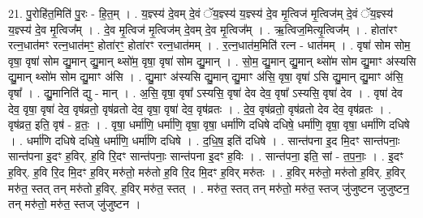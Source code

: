 \documentclass[17pt]{extarticle}
\begin{document}
21. पु॒रोहि॑त॒मिति॑ पु॒रः - हि॒त॒म् । . य॒ज्ञ्स्य॑ दे॒वम् दे॒वं ॅय॒ज्ञ्स्य॑ य॒ज्ञ्स्य॑ दे॒व मृ॒त्विज॑ मृ॒त्विज॑म् दे॒वं ॅय॒ज्ञ्स्य॑ य॒ज्ञ्स्य॑ दे॒व मृ॒त्विज᳚म् । . दे॒व मृ॒त्विज॑ मृ॒त्विज॑म् दे॒वम् दे॒व मृ॒त्विज᳚म् । . ऋ॒त्विज॒मित्यृ॒त्विज᳚म् । . होता॑रꣳ रत्न॒धात॑मꣳ रत्न॒धात॑मꣳ॒॒ होता॑रꣳ॒॒ होता॑रꣳ रत्न॒धात॑मम् । . र॒त्न॒धात॑म॒मिति॑ रत्न - धात॑मम् । . वृषा॑ सोम सोम॒ वृषा॒ वृषा॑ सोम द्यु॒मान् द्यु॒मान् थ्सो॑म॒ वृषा॒ वृषा॑ सोम द्यु॒मान् । . सो॒म॒ द्यु॒मान् द्यु॒मान् थ्सो॑म सोम द्यु॒माꣳ अ॑स्यसि द्यु॒मान् थ्सो॑म सोम द्यु॒माꣳ अ॑सि । . द्यु॒माꣳ अ॑स्यसि द्यु॒मान् द्यु॒माꣳ अ॑सि॒ वृषा॒ वृषा॑ ऽसि द्यु॒मान् द्यु॒माꣳ अ॑सि॒ वृषा᳚ । . द्यु॒मानिति॑ द्यु - मान् । . अ॒सि॒ वृषा॒ वृषा᳚ ऽस्यसि॒ वृषा॑ देव देव॒ वृषा᳚ ऽस्यसि॒ वृषा॑ देव । . वृषा॑ देव देव॒ वृषा॒ वृषा॑ देव॒ वृष॑व्रतो॒ वृष॑व्रतो देव॒ वृषा॒ वृषा॑ देव॒ वृष॑व्रतः । . दे॒व॒ वृष॑व्रतो॒ वृष॑व्रतो देव देव॒ वृष॑व्रतः । . वृष॑व्रत॒ इति॒ वृष॑ - व्र॒तः॒ । . वृषा॒ धर्मा॑णि॒ धर्मा॑णि॒ वृषा॒ वृषा॒ धर्मा॑णि दधिषे दधिषे॒ धर्मा॑णि॒ वृषा॒ वृषा॒ धर्मा॑णि दधिषे । . धर्मा॑णि दधिषे दधिषे॒ धर्मा॑णि॒ धर्मा॑णि दधिषे । . द॒धि॒ष॒ इति॑ दधिषे । . सान्त॑पना इ॒द मि॒दꣳ सान्त॑पनाः॒ सान्त॑पना इ॒दꣳ ह॒विर्. ह॒वि रि॒दꣳ सान्त॑पनाः॒ सान्त॑पना इ॒दꣳ ह॒विः । . सान्त॑पना॒ इति॒ सां - त॒प॒नाः॒ । . इ॒दꣳ ह॒विर्. ह॒वि रि॒द मि॒दꣳ ह॒विर् मरु॑तो॒ मरु॑तो ह॒वि रि॒द मि॒दꣳ ह॒विर् मरु॑तः । . ह॒विर् मरु॑तो॒ मरु॑तो ह॒विर्. ह॒विर् मरु॑त॒ स्तत् तन् मरु॑तो ह॒विर्. ह॒विर् मरु॑त॒ स्तत् । . मरु॑त॒ स्तत् तन् मरु॑तो॒ मरु॑त॒ स्तज् जु॑जुष्टन जुजुष्टन॒ तन् मरु॑तो॒ मरु॑त॒ स्तज् जु॑जुष्टन । \newline
\end{document}
